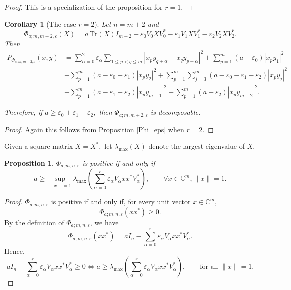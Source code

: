 \documentclass[12pt,a4paper]{amsart}
\theoremstyle{plain}
\newtheorem{corollary}[theorem]{Corollary}
\newtheorem{proposition}[theorem]{Proposition}
\theoremstyle{remark}
\theoremstyle{definition}
\newcommand{\Tr}{{\textrm{Tr}}}
\def \C {\mathbb{C}}
\begin{document}
\begin{proof}
	This is a specialization of the proposition for $r=1.$
\end{proof}

\begin{corollary}[The case $r=2$] \rm
	Let $n=m+2$ and
	\[
	\Phi_{a;m,m+2,\varepsilon}(X)
	=
	a\,\Tr(X)I_{m+2}
	-\varepsilon_0V_0XV_0^*
	-\varepsilon_1V_1XV_1^*
	-\varepsilon_2V_2XV_2^*.
	\]
	Then 
	\[
	\begin{aligned}
		P_{\Phi_{a;m,m+2,\varepsilon}}(x,y)
		&=
		\sum_{\alpha=0}^{2}\varepsilon_\alpha
		\sum_{1\le p<q\le m}
		\left|x_p\overline{y_{q+\alpha}}-x_q\overline{y_{p+\alpha}}\right|^2
		+\sum_{p=1}^m (a-\varepsilon_0)|x_p y_1|^2\\
		&+
		\sum_{p=1}^m (a-\varepsilon_0-\varepsilon_1)|x_p y_2|^2
		+\sum_{p=1}^m\sum_{j=3}^{m}(a-\varepsilon_0-\varepsilon_1-\varepsilon_2)|x_p y_j|^2\\
		&+
		\sum_{p=1}^m (a-\varepsilon_1-\varepsilon_2)|x_p y_{m+1}|^2
		+\sum_{p=1}^m (a-\varepsilon_2)|x_p y_{m+2}|^2.
	\end{aligned}
	\]
	
Therefore,	if $ a\ge \varepsilon_0+\varepsilon_1+\varepsilon_2,$
	then $\Phi_{a;m,m+2,\varepsilon}$ is decomposable.
	
\end{corollary}

\begin{proof}
	Again this follows from Proposition \ref{Phi_eps} when $r=2.$	
\end{proof}
Given a square matrix $X=X^*,$ let $\lambda_{\max} (X)$ denote the largest eigenvalue of $X.$
\begin{proposition}\label{Phi_eps_Pos} %
	\rm
	 $\Phi_{a;m,n,\varepsilon}$ is positive if and only if
	\[
	a\ge
	\sup_{\|x\|=1}
	\lambda_{\max}\!\left(\sum_{\alpha=0}^{r}\varepsilon_\alpha V_\alpha xx^*V_\alpha^*\right), \qquad \forall x\in \C^m, \|x\|=1.
	\]
\end{proposition}

\begin{proof}
	$\Phi_{a;m,n,\varepsilon}$ is positive if and only if, for every unit vector $x\in \C^m,$  
	\[
	\Phi_{a;m,n,\varepsilon}(xx^*)\ge 0.
	\]
By the definition of $\Phi_{a;m,n,\varepsilon}$, we have
	\[
	\Phi_{a;m,n,\varepsilon}(xx^*)
	=
	aI_n-\sum_{\alpha=0}^{r}\varepsilon_\alpha V_\alpha xx^*V_\alpha^*.
	\]
	Hence, %
		\[ aI_n-\sum_{\alpha=0}^{r}\varepsilon_\alpha V_\alpha xx^*V_\alpha^* \ge 0 \Longleftrightarrow
	a\ge \lambda_{\max}\!\left(\sum_{\alpha=0}^{r}\varepsilon_\alpha V_\alpha xx^*V_\alpha^*\right),
	\qquad\text{for all }\|x\|=1.
	\]
\end{proof}
\end{document}
